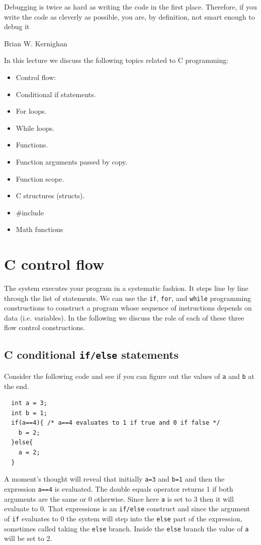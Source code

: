 
\epigraph{Debugging is twice as hard as writing the code in the first place. Therefore, if you write the code as cleverly as possible, you are, by definition, not smart enough to debug it}{Brian W. Kernighan}

\minitoc

In this lecture we discuss the following topics related to C programming:

\begin{itemize}
    \item Control flow:
        \item Conditional if statements.
        \item For loops.
        \item While loops.
    \item Functions.
    \item Function arguments passed by copy.
    \item Function scope.
    \item C structures (structs).
    \item \#include
    \item Math functions
\end{itemize}

\section{C control flow}

The system executes your program in a systematic fashion. It steps line by line through the list of statements. We can use the \texttt{if}, \texttt{for}, and \texttt{while} programming constructions to construct a program whose sequence of instructions depends on data (i.e. variables). In the following we discuss the role of each of these three flow control constructions.

\subsection{C conditional \texttt{if/else} statements}

Consider the following code and see if you can figure out the values of \texttt{a} and \texttt{b} at the end.
\begin{verbatim}
  int a = 3;
  int b = 1;
  if(a==4){ /* a==4 evaluates to 1 if true and 0 if false */
    b = 2;
  }else{
    a = 2;
  }
\end{verbatim}
A moment's thought will reveal that initially \texttt{a=3} and \texttt{b=1} and then the expression \texttt{a==4} is evaluated. The double equals operator returns 1 if both arguments are the same or 0 otherwise. Since here \texttt{a} is set to 3 then it will evaluate to 0. That expressions is an \texttt{if/else} construct and since the argument of \texttt{if} evaluates to 0 the system will step into the \texttt{else} part of the expression, sometimes called taking the \texttt{else} branch. Inside the \texttt{else} branch the value of \texttt{a} will be set to 2. 

